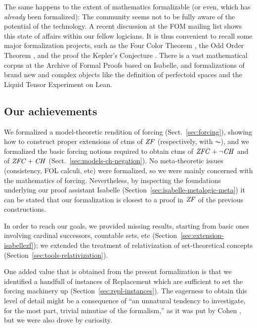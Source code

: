The same happens to the extent of mathematics formalizable (or even,
which has \emph{already} been formalized): The community seems not to
be fully aware of the potential of the technology. A recent discussion
at the FOM mailing list shows this state of affairs within our fellow
logicians. It is thus convenient to recall
some major formalization projects, such as the Four Color Theorem
\cite{MR2463991}, the Odd Order Theorem
\cite{10.1007/978-3-642-39634-2_14}, and the proof the Kepler's
Conjecture \cite{MR3659768}. There is a vast mathematical corpus at
the Archive of Formal Proofs based on Isabelle, and formalizations of
brand new and complex objects like the definition of perfectoid spaces \cite{10.1145/3372885.3373830}
and the Liquid Tensor Experiment \cite{LTE2020,LTE2021} on Lean.

\subsection{Our achievements}
We formalized a model-theoretic rendition of forcing (Sect.~\ref{sec:forcing}), showing how to
construct proper extensions of ctms of $\mathit{ZF}$ (respectively, with
$\AC$), and we formalized the basic forcing notions required to obtain
ctms of $\mathit{ZFC} + \neg\mathit{CH}$ and of $\mathit{ZFC} + \mathit{CH}$ (Sect.~\ref{sec:models-ch-negation}). No meta-theoretic issues
(consistency, FOL calculi, etc) were formalized, so we were mainly
concerned with the mathematics of forcing. Nevertheless, by inspecting
the foundations underlying our proof assistant Isabelle
(Section~\ref{sec:isabelle-metalogic-meta}) it can be stated that our
formalization is closest to a proof in $\mathit{ZF}$ of the previous
constructions.

In order to reach our goals, we provided missing results, starting from basic ones
involving cardinal successors, countable sets, etc
(Section~\ref{sec:extension-isabellezf}); we extended the treatment of relativization of
set-theoretical concepts (Section~\ref{sec:tools-relativization}).

One added value that is obtained from the present formalization is
that we identified a handfull of instances of Replacement which are
sufficient to set the forcing machinery up (Section~\ref{sec:repl-instances}).
The eagerness to obtain this level of detail might be a consequence of
“an unnatural tendency to investigate, for the most part, trivial
minutiae of the formalism,” as it was put by Cohen
\cite{zbMATH02012060}, but we were also drove by curiosity.

